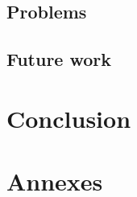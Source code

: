 \documentclass[a4paper]{article}
\begin{document}
	
	\subsection{Problems}
	
	\subsection{Future work}

	\section{Conclusion}	
	
	
	
	
	
	
	
	
	
	
	
	\section{Annexes}
	
	
	
\end{document}
